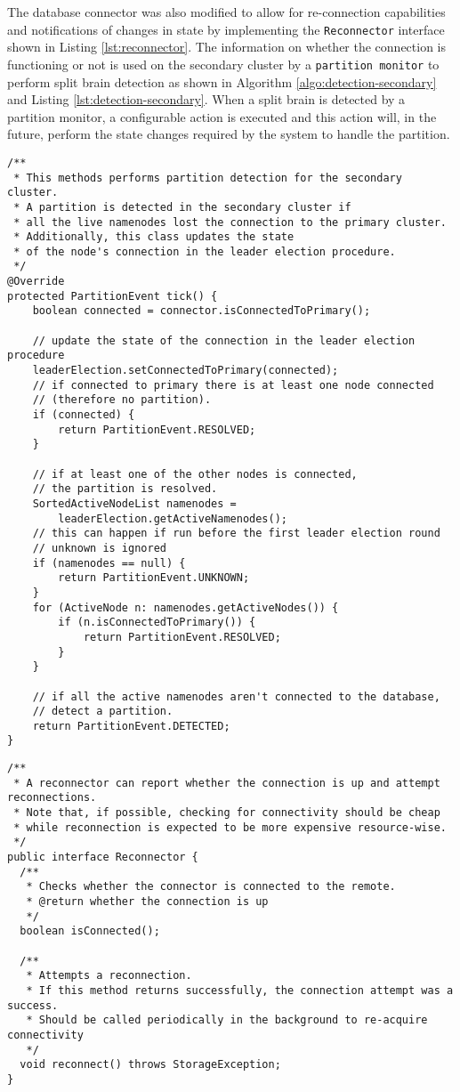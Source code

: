 The database connector was also modified to allow for re-connection capabilities and notifications of changes in state by implementing the \texttt{Reconnector} interface shown in Listing \ref{lst:reconnector}.
The information on whether the connection is functioning or not is used on the secondary cluster by a \texttt{partition monitor} to perform split brain detection as shown in Algorithm \ref{algo:detection-secondary} and Listing \ref{lst:detection-secondary}.
When a split brain is detected by a partition monitor, a configurable action is executed and this action will, in the future, perform the state changes required by the system to handle the partition.
\begin{lstlisting}[caption={Implementation of the partition detection algorithm in the secondary cluster}, label={lst:detection-secondary}]
/**
 * This methods performs partition detection for the secondary cluster.
 * A partition is detected in the secondary cluster if 
 * all the live namenodes lost the connection to the primary cluster.
 * Additionally, this class updates the state 
 * of the node's connection in the leader election procedure.
 */
@Override
protected PartitionEvent tick() {
    boolean connected = connector.isConnectedToPrimary();

    // update the state of the connection in the leader election procedure
    leaderElection.setConnectedToPrimary(connected);
    // if connected to primary there is at least one node connected
    // (therefore no partition).
    if (connected) {
        return PartitionEvent.RESOLVED;
    }

    // if at least one of the other nodes is connected,
    // the partition is resolved.
    SortedActiveNodeList namenodes = 
        leaderElection.getActiveNamenodes();
    // this can happen if run before the first leader election round
    // unknown is ignored
    if (namenodes == null) {
        return PartitionEvent.UNKNOWN;
    }
    for (ActiveNode n: namenodes.getActiveNodes()) {
        if (n.isConnectedToPrimary()) {
            return PartitionEvent.RESOLVED;
        }
    }

    // if all the active namenodes aren't connected to the database,
    // detect a partition.
    return PartitionEvent.DETECTED;
}
\end{lstlisting}

\begin{lstlisting}[caption={Reconnector interface}, label={lst:reconnector}]
/**
 * A reconnector can report whether the connection is up and attempt reconnections.
 * Note that, if possible, checking for connectivity should be cheap
 * while reconnection is expected to be more expensive resource-wise.
 */
public interface Reconnector {
  /**
   * Checks whether the connector is connected to the remote.
   * @return whether the connection is up
   */
  boolean isConnected();

  /**
   * Attempts a reconnection.
   * If this method returns successfully, the connection attempt was a success.
   * Should be called periodically in the background to re-acquire connectivity
   */
  void reconnect() throws StorageException;
}
\end{lstlisting}

